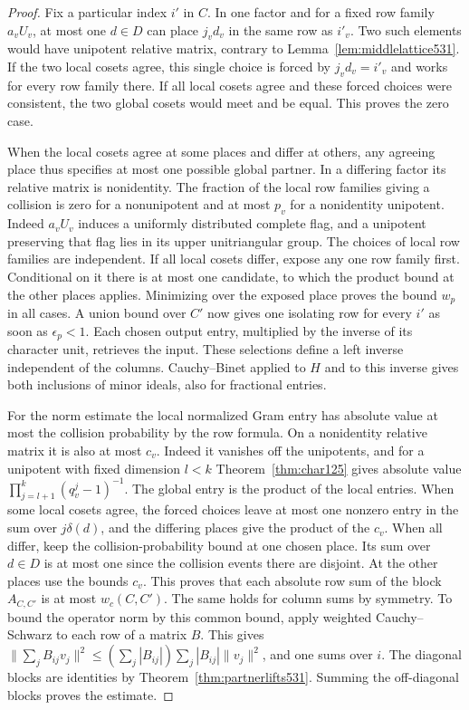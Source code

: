 \documentclass[a4paper,11pt]{article}
\theoremstyle{definition}
\theoremstyle{remark}
\numberwithin{equation}{section}
\begin{document}
\begin{proof}
Fix a particular index \(i'\) in \(C\). In one factor and for
a fixed row family \(a_vU_v\), at most one \(d\in D\) can place
\(j_vd_v\) in the same row as \(i'_v\). Two such elements
would have unipotent relative matrix, contrary to
Lemma~\ref{lem:middlelattice531}. If the two local cosets
agree, this single choice is forced by \(j_vd_v=i'_v\) and
works for every row family there. If all local cosets agree
and these forced choices were consistent, the two global
cosets would meet and be equal. This proves the zero case.

When the local cosets agree at some places and differ at
others, any agreeing place thus specifies at most one possible
global partner. In a differing factor its relative matrix
is nonidentity. The fraction of the local row families giving a
collision is zero for a nonunipotent and at most \(p_v\) for a
nonidentity unipotent. Indeed \(a_vU_v\) induces a uniformly
distributed complete flag, and a unipotent preserving that flag
lies in its upper unitriangular group. The choices of local row
families are independent. If all local cosets differ, expose any
one row family first. Conditional on it there is at most one
candidate, to which the product bound at the other places applies.
Minimizing over the exposed place proves the bound \(w_p\) in
all cases. A union bound over \(C'\) now gives one isolating row
for every \(i'\) as soon as \(\epsilon_p<1\). Each chosen output
entry, multiplied by the inverse of its character unit, retrieves
the input. These selections define a left inverse independent of
the columns. Cauchy--Binet applied to \(H\) and to this inverse
gives both inclusions of minor ideals, also for fractional entries.

For the norm estimate the local normalized Gram entry has
absolute value at most the collision probability by the row
formula. On a nonidentity relative matrix it is also at most
\(c_v\). Indeed it vanishes off the unipotents, and for a
unipotent with fixed dimension \(l<k\) Theorem~\ref{thm:char125}
gives absolute value \(\prod_{j=l+1}^k(q_v^j-1)^{-1}\).
The global entry is the product of the local entries. When some
local cosets agree, the forced choices leave at most one nonzero
entry in the sum over \(j\delta(d)\), and the differing places
give the product of the \(c_v\). When all differ, keep the
collision-probability bound at one chosen place. Its sum over
\(d\in D\) is at most one since the collision events there are
disjoint. At the other places use the bounds \(c_v\). This proves
that each absolute row sum of the block \(A_{C,C'}\) is at most
\(w_c(C,C')\). The same holds for column sums by symmetry.
To bound the operator norm by this common bound, apply weighted
Cauchy--Schwarz to each row of a matrix \(B\). This gives
\(\|\sum_jB_{ij}v_j\|^2\le
 (\sum_j|B_{ij}|)\sum_j|B_{ij}|\|v_j\|^2\), and one sums over
\(i\). The diagonal blocks are identities by
Theorem~\ref{thm:partnerlifts531}. Summing the off-diagonal
blocks proves the estimate.
\end{proof}
\end{document}
